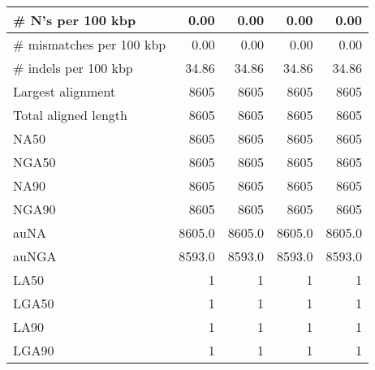 \documentclass[12pt,a4paper]{article}
\begin{document}
\begin{table}[ht]
\begin{center}
\begin{tabular}{|l*{4}{|r}|}
\# N's per 100 kbp & 0.00 & 0.00 & 0.00 & 0.00 \\ \hline
\# mismatches per 100 kbp & 0.00 & 0.00 & 0.00 & 0.00 \\ \hline
\# indels per 100 kbp & 34.86 & 34.86 & 34.86 & 34.86 \\ \hline
Largest alignment & 8605 & 8605 & 8605 & 8605 \\ \hline
Total aligned length & 8605 & 8605 & 8605 & 8605 \\ \hline
NA50 & 8605 & 8605 & 8605 & 8605 \\ \hline
NGA50 & 8605 & 8605 & 8605 & 8605 \\ \hline
NA90 & 8605 & 8605 & 8605 & 8605 \\ \hline
NGA90 & 8605 & 8605 & 8605 & 8605 \\ \hline
auNA & 8605.0 & 8605.0 & 8605.0 & 8605.0 \\ \hline
auNGA & 8593.0 & 8593.0 & 8593.0 & 8593.0 \\ \hline
LA50 & 1 & 1 & 1 & 1 \\ \hline
LGA50 & 1 & 1 & 1 & 1 \\ \hline
LA90 & 1 & 1 & 1 & 1 \\ \hline
LGA90 & 1 & 1 & 1 & 1 \\ \hline
\end{tabular}
\end{center}
\end{table}
\end{document}
